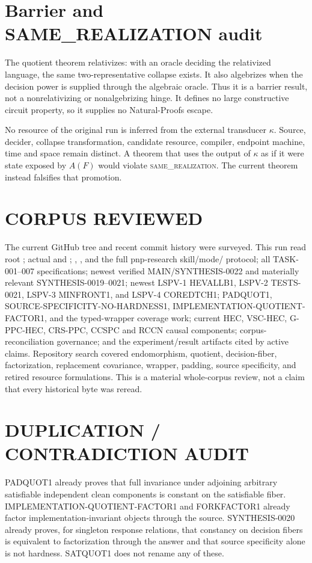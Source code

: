 \documentclass[11pt]{article}
\newcommand{\same}{\textsc{same\_realization}}
\begin{document}
\section{Barrier and SAME\_REALIZATION audit}

The quotient theorem relativizes: with an oracle deciding the relativized
language, the same two-representative collapse exists.  It also algebrizes
when the decision power is supplied through the algebraic oracle.  Thus it is
a barrier result, not a nonrelativizing or nonalgebrizing hinge.  It defines no
large constructive circuit property, so it supplies no Natural-Proofs escape.

No resource of the original run is inferred from the external transducer
$\kappa$.  Source, decider, collapse transformation, candidate resource,
compiler, endpoint machine, time and space remain distinct.  A theorem that
uses the output of $\kappa$ as if it were state exposed by $A(F)$ would violate
\same.  The current theorem instead falsifies that promotion.

\section{CORPUS REVIEWED}

The current GitHub tree and recent commit history were surveyed.  This run
read root ; actual  and ;
, , and the full pnp-research skill/mode/
protocol; all TASK-001--007 specifications; newest verified
MAIN/SYNTHESIS-0022 and materially relevant SYNTHESIS-0019--0021; newest
LSPV-1 HEVALLB1, LSPV-2 TESTS-0021, LSPV-3 MINFRONT1, and LSPV-4 COREDTCH1;
PADQUOT1, SOURCE-SPECIFICITY-NO-HARDNESS1, IMPLEMENTATION-QUOTIENT-FACTOR1,
and the typed-wrapper coverage work; current HEC, VSC-HEC, G-PPC-HEC,
CRS-PPC, CCSPC and RCCN causal components; corpus-reconciliation governance;
and the experiment/result artifacts cited by active claims.  Repository
search covered endomorphism, quotient, decision-fiber, factorization,
replacement covariance, wrapper, padding, source specificity, and retired
resource formulations.  This is a material whole-corpus review, not a claim
that every historical byte was reread.

\section{DUPLICATION / CONTRADICTION AUDIT}

PADQUOT1 already proves that full invariance under adjoining arbitrary
satisfiable independent clean components is constant on the satisfiable
fiber.  IMPLEMENTATION-QUOTIENT-FACTOR1 and FORKFACTOR1 already factor
implementation-invariant objects through the source.  SYNTHESIS-0020 already
proves, for singleton response relations, that constancy on decision fibers
is equivalent to factorization through the answer and that source
specificity alone is not hardness.  SATQUOT1 does not rename any of these.
\end{document}
